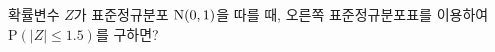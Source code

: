 \noindent\begin{minipage}[t]{0.58\linewidth}\vspace{0pt}\raggedright 확률변수 $Z$가 표준정규분포 $\mathrm{N}(0{,}\mkern3mu\mathopen{}1)$을 따를 때, 오른쪽 표준정규분포표를 이용하여 $\mathrm{P}(|Z|\le 1.5)$를 구하면?\end{minipage}\hfill\begin{minipage}[t]{0.4\linewidth}\vspace{0pt}\centering \resizebox{\ifdim\width>\linewidth\linewidth\else\width\fi}{!}{}\end{minipage}\par
{}
